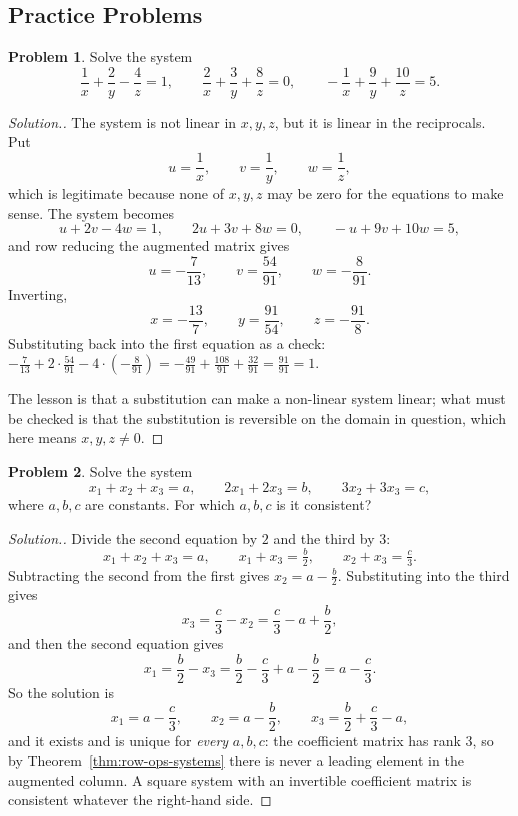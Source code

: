\documentclass[11pt,a4paper]{article}
\theoremstyle{definition}
\newtheorem{problemx}{Problem}[section]
\newenvironment{problem}{\begin{problemx}}{\end{problemx}}
\newenvironment{solution}
  {\renewcommand{\qedsymbol}{}\begin{proof}[\textit{Solution}.]}
  {\end{proof}}
\begin{document}
\subsection{Practice Problems}

\begin{problem}
Solve the system
$$\frac{1}{x}+\frac{2}{y}-\frac{4}{z}=1,\qquad
  \frac{2}{x}+\frac{3}{y}+\frac{8}{z}=0,\qquad
 -\frac{1}{x}+\frac{9}{y}+\frac{10}{z}=5.$$
\end{problem}
\begin{solution}
The system is not linear in $x,y,z$, but it is linear in the reciprocals. Put
$$u=\frac1x,\qquad v=\frac1y,\qquad w=\frac1z,$$
which is legitimate because none of $x,y,z$ may be zero for the equations to
make sense. The system becomes
$$u+2v-4w=1,\qquad 2u+3v+8w=0,\qquad -u+9v+10w=5,$$
and row reducing the augmented matrix gives
$$u=-\frac{7}{13},\qquad v=\frac{54}{91},\qquad w=-\frac{8}{91}.$$
Inverting,
$$x=-\frac{13}{7},\qquad y=\frac{91}{54},\qquad z=-\frac{91}{8}.$$
Substituting back into the first equation as a check:
$-\frac{7}{13}+2\cdot\frac{54}{91}-4\cdot\left(-\frac{8}{91}\right)
=-\frac{49}{91}+\frac{108}{91}+\frac{32}{91}=\frac{91}{91}=1.$

The lesson is that a substitution can make a non-linear system linear; what
must be checked is that the substitution is reversible on the domain in
question, which here means $x,y,z\neq 0$.
\end{solution}

\begin{problem}
Solve the system
$$x_1+x_2+x_3=a,\qquad 2x_1+2x_3=b,\qquad 3x_2+3x_3=c,$$
where $a,b,c$ are constants. For which $a,b,c$ is it consistent?
\end{problem}
\begin{solution}
Divide the second equation by $2$ and the third by $3$:
$$x_1+x_2+x_3=a,\qquad x_1+x_3=\tfrac{b}{2},\qquad x_2+x_3=\tfrac{c}{3}.$$
Subtracting the second from the first gives $x_2=a-\frac{b}{2}$. Substituting
into the third gives
$$x_3=\frac{c}{3}-x_2=\frac{c}{3}-a+\frac{b}{2},$$
and then the second equation gives
$$x_1=\frac{b}{2}-x_3=\frac{b}{2}-\frac{c}{3}+a-\frac{b}{2}=a-\frac{c}{3}.$$
So the solution is
$$x_1=a-\frac{c}{3},\qquad x_2=a-\frac{b}{2},\qquad
  x_3=\frac{b}{2}+\frac{c}{3}-a,$$
and it exists and is unique for \emph{every} $a,b,c$: the coefficient matrix
has rank $3$, so by Theorem~\ref{thm:row-ops-systems} there is never a leading
element in the augmented column. A square system with an invertible coefficient
matrix is consistent whatever the right-hand side.
\end{solution}
\end{document}
